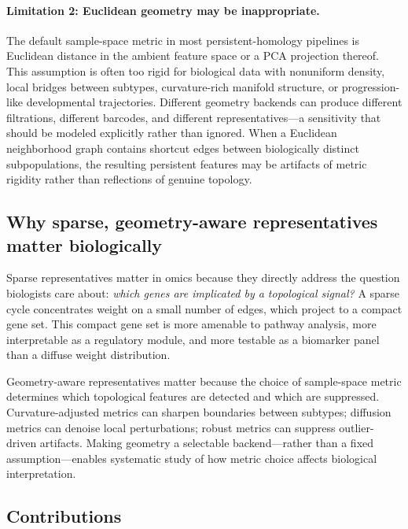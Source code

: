 \documentclass[11pt]{article}
\begin{document}
\paragraph{Limitation 2: Euclidean geometry may be inappropriate.}
The default sample-space metric in most persistent-homology pipelines is Euclidean distance in the ambient feature space or a PCA projection thereof.
This assumption is often too rigid for biological data with nonuniform density, local bridges between subtypes, curvature-rich manifold structure, or progression-like developmental trajectories.
Different geometry backends can produce different filtrations, different barcodes, and different representatives---a sensitivity that should be modeled explicitly rather than ignored.
When a Euclidean neighborhood graph contains shortcut edges between biologically distinct subpopulations, the resulting persistent features may be artifacts of metric rigidity rather than reflections of genuine topology.

\subsection{Why sparse, geometry-aware representatives matter biologically}

Sparse representatives matter in omics because they directly address the question biologists care about: \emph{which genes are implicated by a topological signal?}
A sparse cycle concentrates weight on a small number of edges, which project to a compact gene set.
This compact gene set is more amenable to pathway analysis, more interpretable as a regulatory module, and more testable as a biomarker panel than a diffuse weight distribution.

Geometry-aware representatives matter because the choice of sample-space metric determines which topological features are detected and which are suppressed.
Curvature-adjusted metrics can sharpen boundaries between subtypes; diffusion metrics can denoise local perturbations; robust metrics can suppress outlier-driven artifacts.
Making geometry a selectable backend---rather than a fixed assumption---enables systematic study of how metric choice affects biological interpretation.

\subsection{Contributions}
\end{document}
